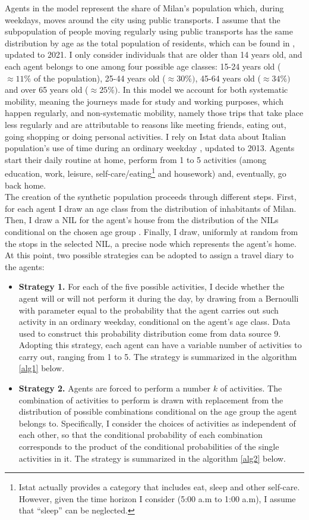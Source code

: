 Agents in the model represent the share of Milan's population which, during weekdays, moves around the city using public transports. I assume that the subpopulation of people moving regularly using public transports has the same distribution by age as the total population of residents, which can be found in \cite{site18}, updated to 2021. I only consider individuals that are older than 14 years old, and each agent belongs to one among four possible age classes: 15-24 years old ($\approx 11\%$ of the population), 25-44 years old ($\approx 30\%)$, 45-64 years old ($\approx 34\%)$ and over 65 years old ($\approx 25\%)$.
In this model we account for both systematic mobility, meaning the journeys made for study and working purposes, which happen regularly, and non-systematic mobility, namely those trips that take place less regularly and are attributable to reasons like meeting friends, eating out, going shopping or doing personal activities. I rely on Istat data about Italian population's use of time during an ordinary weekday \cite{site14}, updated to 2013. Agents start their daily routine at home, perform from 1 to 5 activities (among education, work, leisure, self-care/eating\footnote{Istat actually provides a category that includes eat, sleep and other self-care. However, given the time horizon I consider (5:00 a.m  to 1:00 a.m), I assume that “sleep” can be neglected.} and housework) and, eventually, go back home. \\
The creation of the synthetic population proceeds through different steps. First, for each agent I draw an age class from the distribution of inhabitants of Milan. Then, I draw a NIL for the agent's house from the distribution of the NILs conditional on the chosen age group \cite{site18}. Finally, I draw, uniformly at random from the stops in the selected NIL, a precise node which represents the agent’s home.
At this point, two possible strategies can be adopted to assign a travel diary to the agents:
\begin{itemize}
    \item \textbf{Strategy 1.} For each of the five possible activities, I decide whether the agent will or will not perform it during the day, by drawing from a Bernoulli with parameter equal to the probability that the agent carries out such activity in an ordinary weekday, conditional on the agent's age class. Data used to construct this probability distribution come from data source 9. Adopting this strategy, each agent can have a variable number of activities to carry out, ranging from 1 to 5. The strategy is summarized in the algorithm \ref{alg1} below.
    \item \textbf{Strategy 2.} Agents are forced to perform a number $k$ of activities. The combination of activities to perform is drawn with replacement from the distribution of possible combinations conditional on the age group the agent belongs to. Specifically, I consider the choices of activities as independent of each other, so that the conditional probability of each combination corresponds to the product of the conditional probabilities of the single activities in it. The strategy is summarized in the algorithm \ref{alg2} below.
\end{itemize}

